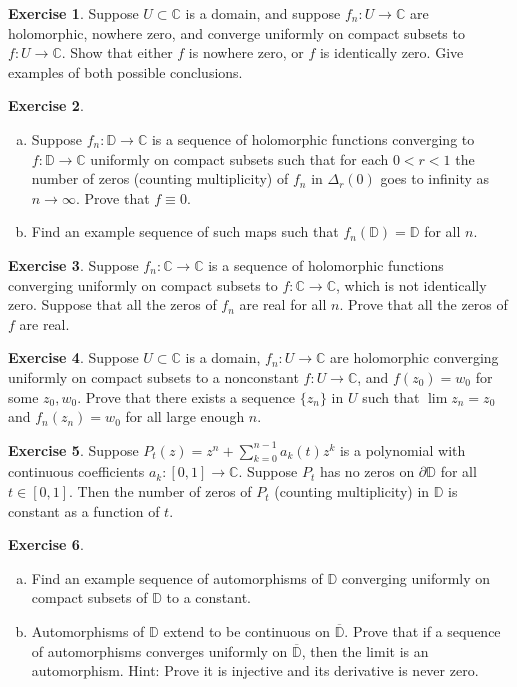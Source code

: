 \documentclass[12pt,openany]{book}
\newcommand{\C}{{\mathbb{C}}}
\newcommand{\D}{{\mathbb{D}}}
\theoremstyle{plain}
\theoremstyle{remark}
\theoremstyle{definition}
\newenvironment{exbox}{%
    \def\FrameCommand{\vrule width 1pt \relax\hspace{10pt}}%
    \MakeFramed{\advance\hsize-\width\FrameRestore}%
}{%
    \endMakeFramed
}
\newenvironment{exparts}{%
    \leavevmode\begin{enumerate}[a),noitemsep,topsep=0pt,parsep=0pt,partopsep=0pt]
}{%
    \end{enumerate}
}
\theoremstyle{exercise}
\newtheorem{exercise}{Exercise}[section]
\theoremstyle{example}
\begin{document}
\begin{exbox}
\begin{exercise}
Suppose $U \subset \C$ is a domain,
and suppose
$f_n \colon U \to \C$ are holomorphic, nowhere zero,
and converge uniformly on compact subsets to $f \colon U \to \C$.
Show that either $f$ is nowhere zero, or $f$ is identically zero.
Give examples of both possible conclusions.
\end{exercise}

\begin{exercise}
\begin{exparts}
\item
Suppose $f_n \colon \D \to \C$ is a sequence of holomorphic functions converging
to $f \colon \D \to \C$ uniformly on compact subsets such that
for each $0 < r < 1$ the number of zeros (counting multiplicity)
of $f_n$ in $\Delta_r(0)$ goes to infinity as $n \to \infty$.
Prove that $f \equiv 0$.
\item
Find an example sequence of such maps such that $f_n(\D) = \D$
for all $n$.
\end{exparts}
\end{exercise}

\begin{exercise}
Suppose 
$f_n \colon \C \to \C$ is a sequence of holomorphic
functions
converging uniformly on compact subsets to $f \colon \C \to \C$,
which is not identically zero.
Suppose that all the zeros of $f_n$ are real for all $n$.
Prove that all the zeros of $f$ are real.
\end{exercise}

\begin{exercise}
Suppose $U \subset \C$ is a domain,
$f_n \colon U \to \C$ are holomorphic
converging uniformly on compact subsets to a nonconstant $f \colon U \to \C$,
and $f(z_0) = w_0$ for some $z_0, w_0$.  
Prove that there exists a sequence $\{ z_n \}$ in $U$ such that
$\lim z_n = z_0$ and $f_n(z_n) = w_0$ for all large enough $n$.
\end{exercise}

\begin{exercise}
Suppose $P_t(z) = z^n + \sum_{k=0}^{n-1} a_k(t) z^k$ is a polynomial
with continuous coefficients $a_k \colon [0,1] \to \C$.  Suppose $P_t$ has
no zeros on $\partial \D$ for all $t \in [0,1]$.  Then the number of zeros
of $P_t$ (counting multiplicity) in $\D$ is constant as a function of $t$.
\end{exercise}

\begin{exercise}
\begin{exparts}
\item
Find an example sequence of automorphisms of $\D$ converging
uniformly on compact subsets of $\D$ to a constant.
\item
Automorphisms of $\D$ extend to be continuous on
$\overline{\D}$.  Prove that if a sequence
of automorphisms converges uniformly on $\overline{\D}$, then
the limit is an automorphism. Hint: Prove it is injective
and its derivative is never zero.
\end{exparts}
\end{exercise}


\end{exbox}
\end{document}
